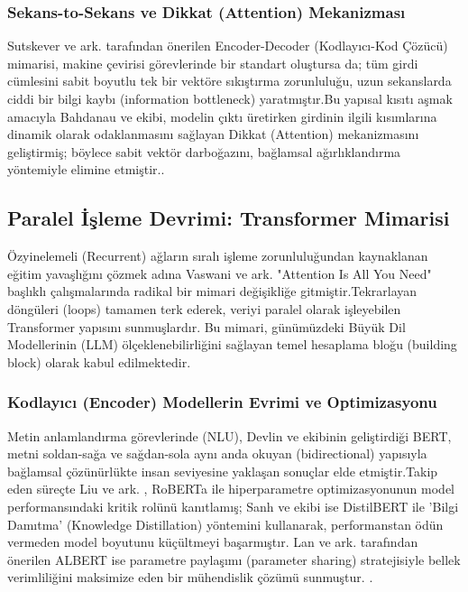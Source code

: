 \documentclass[12pt,a4paper]{report}
\begin{document}
\subsubsection{Sekans-to-Sekans ve Dikkat (Attention) Mekanizması}
Sutskever ve ark. tarafından önerilen Encoder-Decoder (Kodlayıcı-Kod Çözücü) mimarisi, makine çevirisi görevlerinde bir standart oluştursa da; tüm girdi cümlesini sabit boyutlu tek bir vektöre sıkıştırma zorunluluğu, uzun sekanslarda ciddi bir bilgi kaybı (information bottleneck) yaratmıştır\cite{sutskever2014sequence}.Bu yapısal kısıtı aşmak amacıyla Bahdanau ve ekibi, modelin çıktı üretirken girdinin ilgili kısımlarına dinamik olarak odaklanmasını sağlayan Dikkat (Attention) mekanizmasını geliştirmiş; böylece sabit vektör darboğazını, bağlamsal ağırlıklandırma yöntemiyle elimine etmiştir.\cite{bahdanau2015neural}.

\subsection{Paralel İşleme Devrimi: Transformer Mimarisi}
Özyinelemeli (Recurrent) ağların sıralı işleme zorunluluğundan kaynaklanan eğitim yavaşlığını çözmek adına Vaswani ve ark. "Attention Is All You Need" başlıklı çalışmalarında radikal bir mimari değişikliğe gitmiştir\cite{vaswani2017attention}.Tekrarlayan döngüleri (loops) tamamen terk ederek, veriyi paralel olarak işleyebilen Transformer yapısını sunmuşlardır. Bu mimari, günümüzdeki Büyük Dil Modellerinin (LLM) ölçeklenebilirliğini sağlayan temel hesaplama bloğu (building block) olarak kabul edilmektedir.

\subsubsection{Kodlayıcı (Encoder) Modellerin Evrimi ve Optimizasyonu}
Metin anlamlandırma görevlerinde (NLU), Devlin ve ekibinin geliştirdiği BERT, metni soldan-sağa ve sağdan-sola aynı anda okuyan (bidirectional) yapısıyla bağlamsal çözünürlükte insan seviyesine yaklaşan sonuçlar elde etmiştir\cite{devlin2018bert}.Takip eden süreçte Liu ve ark. , RoBERTa ile hiperparametre optimizasyonunun model performansındaki kritik rolünü kanıtlamış\cite{liu2019roberta}; Sanh ve ekibi ise DistilBERT ile 'Bilgi Damıtma' (Knowledge Distillation) yöntemini kullanarak, performanstan ödün vermeden model boyutunu küçültmeyi başarmıştır\cite{sanh2019distilbert}. Lan ve ark. tarafından önerilen ALBERT ise parametre paylaşımı (parameter sharing) stratejisiyle bellek verimliliğini maksimize eden bir mühendislik çözümü sunmuştur. \cite{lan2019albert}.
\end{document}
